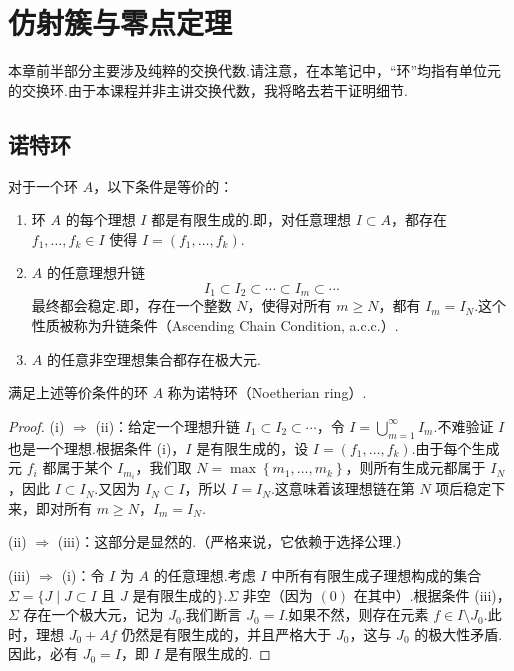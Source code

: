 \chapter{仿射簇与零点定理}

本章前半部分主要涉及纯粹的交换代数.请注意，在本笔记中，“环”均指有单位元的交换环.由于本课程并非主讲交换代数，我将略去若干证明细节.

\section{诺特环}

\begin{proposition}[诺特环的等价定义]
对于一个环 \(A\)，以下条件是等价的：
\begin{enumerate}
    \item 环 \(A\) 的每个理想 \(I\) 都是有限生成的.即，对任意理想 \(I \subset A\)，都存在 \({f}_{1},\ldots ,{f}_{k} \in I\) 使得 \(I = \left( {{f}_{1},\ldots ,{f}_{k}}\right)\).
    \item \(A\) 的任意理想升链
    \[
    {I}_{1} \subset  {I}_{2} \subset  \cdots  \subset  {I}_{m} \subset  \cdots
    \]
    最终都会稳定.即，存在一个整数 \(N\)，使得对所有 \(m \geq N\)，都有 \({I}_{m} = {I}_{N}\).这个性质被称为升链条件（Ascending Chain Condition, a.c.c.）.
    \item \(A\) 的任意非空理想集合都存在极大元.
\end{enumerate}
\end{proposition}
\begin{definition}[诺特环]
满足上述等价条件的环 \(A\) 称为诺特环（Noetherian ring）.
\end{definition}

\begin{proof}
(i) \(\Rightarrow\) (ii)：给定一个理想升链 \({I}_{1} \subset  {I}_{2} \subset  \cdots\)，令 \(I = \bigcup_{m=1}^{\infty} {I}_{m}\).不难验证 \(I\) 也是一个理想.根据条件 (i)，\(I\) 是有限生成的，设 \(I = \left( {{f}_{1},\ldots ,{f}_{k}}\right)\).由于每个生成元 \({f}_{i}\) 都属于某个 \({I}_{{m}_{i}}\)，我们取 \(N = \max \left\{ {m}_{1}, \ldots, {m}_{k} \right\}\)，则所有生成元都属于 \({I}_{N}\)，因此 \(I \subset {I}_{N}\).又因为 \({I}_{N} \subset I\)，所以 \(I = {I}_{N}\).这意味着该理想链在第 \(N\) 项后稳定下来，即对所有 \(m \geq N\)，\({I}_{m} = {I}_{N}\).

(ii) \(\Rightarrow\) (iii)：这部分是显然的.（严格来说，它依赖于选择公理.）

(iii) \(\Rightarrow\) (i)：令 \(I\) 为 \(A\) 的任意理想.考虑 \(I\) 中所有有限生成子理想构成的集合 \(\Sigma = \{ J \mid J \subset I \text{ 且 } J \text{ 是有限生成的} \}\).\(\Sigma\) 非空（因为 \((0)\) 在其中）.根据条件 (iii)，\(\Sigma\) 存在一个极大元，记为 \({J}_{0}\).我们断言 \({J}_{0} = I\).如果不然，则存在元素 \(f \in I \setminus {J}_{0}\).此时，理想 \({J}_{0} + Af\) 仍然是有限生成的，并且严格大于 \({J}_{0}\)，这与 \({J}_{0}\) 的极大性矛盾.因此，必有 \({J}_{0} = I\)，即 \(I\) 是有限生成的.
\end{proof}


